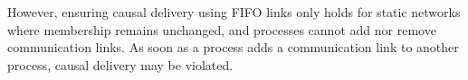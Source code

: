 %     



However, ensuring causal delivery using FIFO links only holds for static
networks where membership remains unchanged, and processes cannot add nor remove
communication links. As soon as a process adds a communication link to another
process, causal delivery may be violated.





